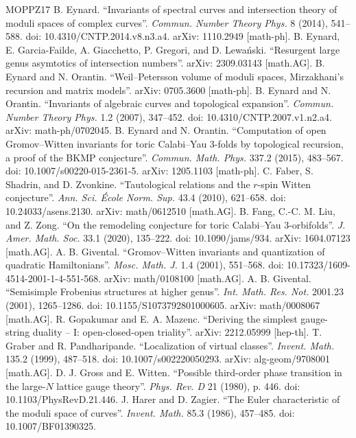 \begin{thebibliography}{MOPPZ17}
 B. Eynard. ``Invariants of spectral curves and intersection theory of moduli spaces of complex curves''. \emph{Commun. Number Theory Phys.} 8 (2014), 541--588. doi: 10.4310/CNTP.2014.v8.n3.a4. arXiv: 1110.2949 [math-ph].
 B. Eynard, E. Garcia-Failde, A. Giacchetto, P. Gregori, and D. Lewa\'nski. ``Resurgent large genus asymtotics of intersection numbers''. arXiv: 2309.03143 [math.AG].
 B. Eynard and N. Orantin. ``Weil--Petersson volume of moduli spaces, Mirzakhani's recursion and matrix models''. arXiv: 0705.3600 [math-ph].
 B. Eynard and N. Orantin. ``Invariants of algebraic curves and topological expansion''. \emph{Commun. Number Theory Phys.} 1.2 (2007), 347--452. doi: 10.4310/CNTP.2007.v1.n2.a4. arXiv: math-ph/0702045.
 B. Eynard and N. Orantin. ``Computation of open Gromov--Witten invariants for toric Calabi--Yau 3-folds by topological recursion, a proof of the BKMP conjecture''. \emph{Commun. Math. Phys.} 337.2 (2015), 483--567. doi: 10.1007/s00220-015-2361-5. arXiv: 1205.1103 [math-ph].
 C. Faber, S. Shadrin, and D. Zvonkine. ``Tautological relations and the $r$-spin Witten conjecture''. \emph{Ann. Sci. \'Ecole Norm. Sup.} 43.4 (2010), 621--658. doi: 10.24033/asens.2130. arXiv: math/0612510 [math.AG].
 B. Fang, C.-C. M. Liu, and Z. Zong. ``On the remodeling conjecture for toric Calabi--Yau 3-orbifolds''. \emph{J. Amer. Math. Soc.} 33.1 (2020), 135--222. doi: 10.1090/jams/934. arXiv: 1604.07123 [math.AG].
 A. B. Givental. ``Gromov--Witten invariants and quantization of quadratic Hamiltonians''. \emph{Mosc. Math. J.} 1.4 (2001), 551--568. doi: 10.17323/1609-4514-2001-1-4-551-568. arXiv: math/0108100 [math.AG].
 A. B. Givental. ``Semisimple Frobenius structures at higher genus''. \emph{Int. Math. Res. Not.} 2001.23 (2001), 1265--1286. doi: 10.1155/S1073792801000605. arXiv: math/0008067 [math.AG].
 R. Gopakumar and E. A. Mazenc. ``Deriving the simplest gauge-string duality -- I: open-closed-open triality''. arXiv: 2212.05999 [hep-th].
 T. Graber and R. Pandharipande. ``Localization of virtual classes''. \emph{Invent. Math.} 135.2 (1999), 487--518. doi: 10.1007/s002220050293. arXiv: alg-geom/9708001 [math.AG].
 D. J. Gross and E. Witten. ``Possible third-order phase transition in the large-$N$ lattice gauge theory''. \emph{Phys. Rev. D} 21 (1980), p. 446. doi: 10.1103/PhysRevD.21.446.
 J. Harer and D. Zagier. ``The Euler characteristic of the moduli space of curves''. \emph{Invent. Math.} 85.3 (1986), 457--485. doi: 10.1007/BF01390325.

\end{thebibliography}
